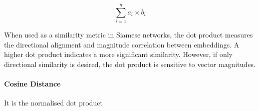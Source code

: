 $$\sum^n_{i=1}a_i \times b_i$$

When used as a similarity metric in Siamese networks, the dot product measures the directional alignment and magnitude correlation between embeddings. A higher dot product indicates a more significant similarity. However, if only directional similarity is desired, the dot product is sensitive to vector magnitudes.

\paragraph{Cosine Distance} \label{METRIC:CosineDistance}
It is the normalised dot product
